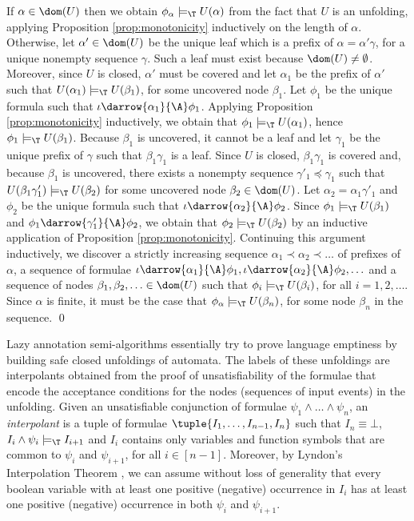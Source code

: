 {  If $\alpha \in \dom(U)$ then we obtain $\phi_{\alpha} \models_\T
  U(\alpha)$ from the fact that $U$ is an unfolding, applying
  Proposition \ref{prop:monotonicity} inductively on the length of
  $\alpha$. Otherwise, let $\alpha' \in \dom(U)$ be the unique leaf
  which is a prefix of $\alpha = \alpha'\gamma$, for a unique nonempty
  sequence $\gamma$. Such a leaf must exist because $\dom(U) \neq
  \emptyset$. Moreover, since $U$ is closed, $\alpha'$ must be covered
  and let $\alpha_1$ be the prefix of $\alpha'$ such that $U(\alpha_1)
  \models_\T U(\beta_1)$, for some uncovered node $\beta_1$. Let
  $\phi_1$ be the unique formula such that $\iota
  \darrow{\alpha_1}{\A} \phi_1$. Applying Proposition
  \ref{prop:monotonicity} inductively, we obtain that $\phi_1
  \models_\T U(\alpha_1)$, hence $\phi_1 \models_\T U(\beta_1)$.
  Because $\beta_1$ is uncovered, it cannot be a leaf and let
  $\gamma_1$ be the unique prefix of $\gamma$ such that
  $\beta_1\gamma_1$ is a leaf. Since $U$ is closed, $\beta_1\gamma_1$
  is covered and, because $\beta_1$ is uncovered, there exists a
  nonempty sequence $\gamma'_1 \preceq \gamma_1$ such that
  $U(\beta_1\gamma'_1) \models_\T U(\beta_2)$ for some uncovered node
  $\beta_2 \in \dom(U)$. Let $\alpha_2 = \alpha_1\gamma'_1$ and
  $\phi_2$ be the unique formula such that $\iota
  \darrow{\alpha_2}{\A} \phi_2$. Since $\phi_1 \models_\T U(\beta_1)$
  and $\phi_1 \darrow{\gamma'_1}{\A} \phi_2$, we obtain that $\phi_2
  \models_\T U(\beta_2)$ by an inductive application of Proposition
  \ref{prop:monotonicity}. Continuing this argument inductively, we
  discover a strictly increasing sequence $\alpha_1 \prec \alpha_2
  \prec \ldots$ of prefixes of $\alpha$, a sequence of formulae $\iota
  \darrow{\alpha_1}{\A} \phi_1, \iota \darrow{\alpha_2}{\A} \phi_2,
  \ldots$ and a sequence of nodes $\beta_1, \beta_2, \ldots \in
  \dom(U)$ such that $\phi_i \models_\T U(\beta_i)$, for all $i =
  1,2,\ldots$. Since $\alpha$ is finite, it must be the case that
  $\phi_\alpha \models_\T U(\beta_n)$, for some node $\beta_n$ in the
  sequence. \qed}

Lazy annotation semi-algorithms \cite{McMillan06,McMillan14}
essentially try to prove language emptiness by building safe closed
unfoldings of automata. The labels of these unfoldings are
interpolants obtained from the proof of unsatisfiability of the
formulae that encode the acceptance conditions for the nodes
(sequences of input events) in the unfolding. Given an unsatisfiable
conjunction of formulae $\psi_1 \wedge \ldots \wedge \psi_n$, an
\emph{interpolant} is a tuple of formulae
$\tuple{I_1,\ldots,I_{n-1},I_n}$ such that $I_n \equiv \bot$, $I_i
\wedge \psi_i \models_\T I_{i+1}$ and $I_i$ contains only variables
and function symbols that are common to $\psi_i$ and $\psi_{i+1}$, for
all $i \in [n-1]$. Moreover, by Lyndon's Interpolation Theorem
\cite{Lyndon59}, we can assume without loss of generality that every
boolean variable with at least one positive (negative) occurrence in
$I_i$ has at least one positive (negative) occurrence in both $\psi_i$
and $\psi_{i+1}$.

